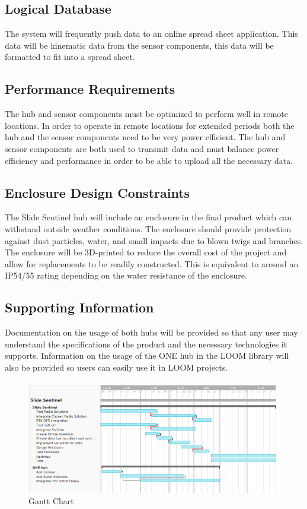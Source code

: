 \documentclass[onecolumn, draftclsnofoot,10pt, compsoc]{IEEEtran}
\begin{document}
\subsection{Logical Database}
The system will frequently push data to an online spread sheet application. This data will be kinematic data from the sensor components, this data will be formatted to fit into a spread sheet.

\subsection{Performance Requirements} %
The hub and sensor components must be optimized to perform well in remote locations. In order to operate in remote locations for extended periods both the hub and the sensor components need to be very power efficient. The hub and sensor components are both used to transmit data and must balance power efficiency and performance in order to be able to upload all the necessary data.

\subsection{Enclosure Design Constraints} %
The Slide Sentinel hub will include an enclosure in the final product which can withstand outside weather conditions. The enclosure should provide protection against dust particles, water, and small impacts due to blown twigs and branches. The enclosure will be 3D-printed to reduce the overall cost of the project and allow for replacements to be readily constructed. This is equivalent to around an IP54/55 rating depending on the water resistance of the enclosure.

\subsection{Supporting Information} %
Documentation on the usage of both hubs will be provided so that any user may understand the specifications of the product and the necessary technologies it supports. Information on the usage of the ONE hub in the LOOM library will also be provided so users can easily use it in LOOM projects.
\begin{figure}[h]
    \centering
    \includegraphics[width=6.5in]{gantt.PNG}
    \caption{Gantt Chart}
    \label{fig:Gantt_Chart}
\end{figure}
\end{document}
